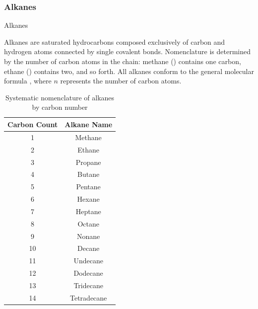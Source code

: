 \documentclass[10pt]{article}
\begin{document}
    \subsubsection{Alkanes}
      \label{sec:alkane}

      \begin{core}{Alkanes}

        Alkanes are saturated hydrocarbons composed exclusively of carbon and hydrogen atoms connected by single covalent bonds. Nomenclature is determined by the number of carbon atoms in the chain: methane () contains one carbon, ethane () contains two, and so forth. All alkanes conform to the general molecular formula , where $n$ represents the number of carbon atoms.

        \begin{table}[H]
          \centering
          \begin{tabular}{cc}
            \hline
            Carbon Count & Alkane Name \\
            \hline
            1 & Methane \\
            2 & Ethane \\
            3 & Propane \\
            4 & Butane \\
            5 & Pentane \\
            6 & Hexane \\
            7 & Heptane \\
            8 & Octane \\
            9 & Nonane \\
            10 & Decane \\
            11 & Undecane \\
            12 & Dodecane \\
            13 & Tridecane \\
            14 & Tetradecane \\
            \hline
          \end{tabular}
          \caption{Systematic nomenclature of alkanes by carbon number}
          \label{tab:alkanes}
        \end{table}

      \end{core}
\end{document}

